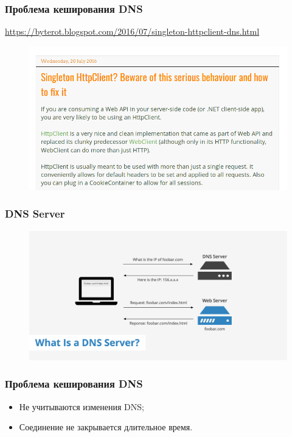 \documentclass[17pt,aspectratio=169]{beamer}
\begin{document}
\begin{frame}
\frametitle{Проблема кеширования DNS}
\href{https://byterot.blogspot.com/2016/07/singleton-httpclient-dns.html}{https://byterot.blogspot.com/2016/07/singleton-httpclient-dns.html}
\begin{figure}
\includegraphics[scale=0.4]{byterot}
\end{figure}
\end{frame}

\begin{frame}
\frametitle{DNS Server}
\begin{figure}
\includegraphics[scale=0.18]{dns}
\end{figure}
\end{frame}

\begin{frame}
\frametitle{Проблема кеширования DNS}
\begin{itemize}
	\item Не учитываются изменения DNS;
	\item Соединение не закрывается длительное время.
\end{itemize}
\end{frame}
\end{document}
